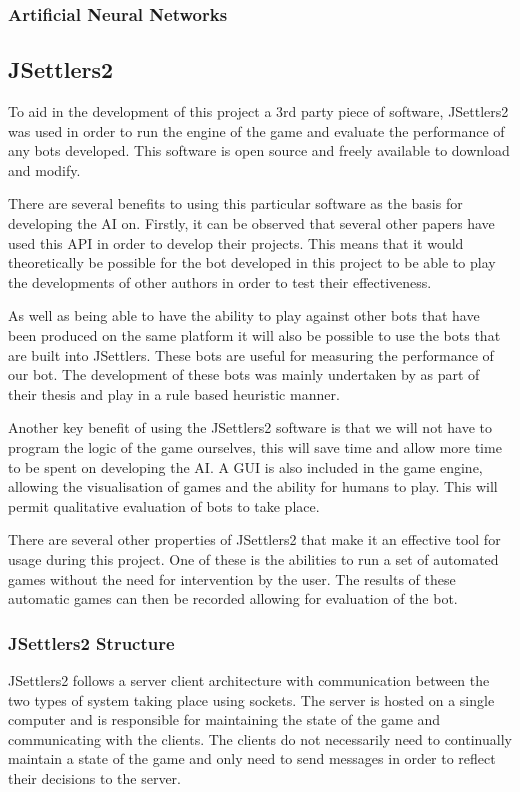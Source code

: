 \documentclass[]{article}
\begin{document}
\subsubsection{Artificial Neural Networks}

\subsection{JSettlers2}
To aid in the development of this project a 3rd party piece of software, JSettlers2 was used in order to run the engine of the game and evaluate the performance of any bots developed. This software is open source and freely available to download and modify.

\par There are several benefits to using this particular software as the basis for developing the AI on. Firstly, it can be observed that several other papers have used this API in order to develop their projects. This means that it would theoretically be possible for the bot developed in this project to be able to play the developments of other authors in order to test their effectiveness. 

\par As well as being able to have the ability to play against other bots that have been produced on the same platform it will also be possible to use the bots that are built into JSettlers. These bots are useful for measuring the performance of our bot. The development of these bots was mainly undertaken by \textcite{thomas2003real} as part of their thesis and play in a rule based heuristic manner.

\par Another key benefit of using the JSettlers2 software is that we will not have to program the logic of the game ourselves, this will save time and allow more time to be spent on developing the AI. A GUI is also included in the game engine, allowing the visualisation of games and the ability for humans to play. This will permit qualitative evaluation of bots to take place.

\par There are several other properties of JSettlers2 that make it an effective tool for usage during this project. One of these is the abilities to run a set of automated games without the need for intervention by the user. The results of these automatic games can then be recorded allowing for evaluation of the bot. 

\subsubsection{JSettlers2 Structure}
JSettlers2 follows a server client architecture with communication between the two types of system taking place using sockets. The server is hosted on a single computer and is responsible for maintaining the state of the game and communicating with the clients. The clients do not necessarily need to continually maintain a state of the game and only need to send messages in order to reflect their decisions to the server.
\end{document}
